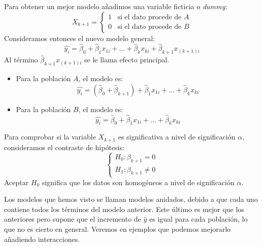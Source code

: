 Para obtener un mejor modelo añadimos una variable ficticia o \textit{dummy}:
$$X_{k+1} = \begin{cases}
        1 & \text{si el dato procede de } A \\
        0 & \text{si el dato procede de } B
    \end{cases}$$
Consideramos entonces el nuevo modelo general:
$$\hat{y_i} = \hat{\beta}_0 + \hat{\beta}_1x_{1i} + \dots + \hat{\beta}_kx_{ki} + \hat{\beta}_{k+1}x_{(k+1)i}$$
Al término $\hat{\beta}_{k+1}x_{(k+1)i}$ se le llama efecto principal.
\begin{itemize}
    \item Para la población $A$, el modelo es:
          $$\hat{y_i} = (\hat{\beta}_0 + \hat{\beta}_{k+1}) + \hat{\beta}_1x_{1i} + \dots + \hat{\beta}_kx_{ki}$$
    \item Para la población $B$, el modelo es:
          $$\hat{y_i} = \hat{\beta}_0 + \hat{\beta}_1x_{1i} + \dots + \hat{\beta}_kx_{ki}$$
\end{itemize}

Para comprobar si la variable $X_{k+1}$ es significativa a nivel de significación $\alpha$, consideramos el contraste de hipótesis:
$$\begin{cases}
        H_0: \beta_{k+1} = 0 \\
        H_1: \beta_{k+1} \neq 0
    \end{cases}$$
Aceptar $H_0$ significa que los datos son homogéneos a nivel de significación $\alpha$.

Los modelos que hemos visto se llaman modelos anidados, debido a que cada uno contiene todos los términos del modelo anterior.
Este último es mejor que los anteriores pero supone que el incremento de $\hat{y}$ es igual para cada población, lo que no es cierto en general.
Veremos en ejemplos que podemos mejorarlo añadiendo interacciones.

